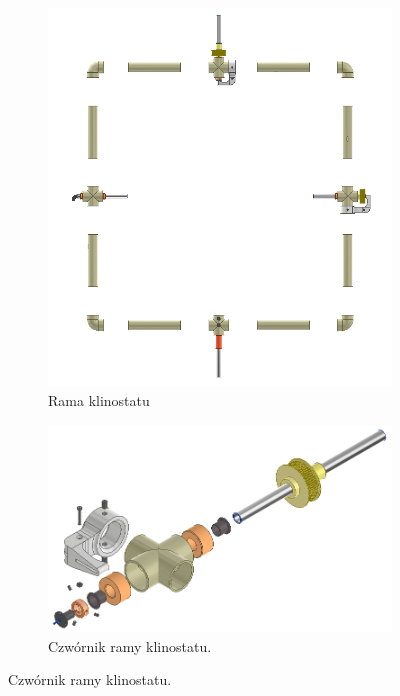 \begin{figure}[]
	\centering
	
	\begin{subfigure}[b]{.49\textwidth}
		\centering
		\includegraphics[width=\textwidth]{rama_40_aisass}
		\caption{Rama klinostatu} 
		\label{fig:rama_klinostatu}
	\end{subfigure}
	\hfill%
	\begin{subfigure}[b]{.49\textwidth}
		\centering
		\includegraphics[width=\textwidth]{2_diss}
		\caption{Czwórnik ramy klinostatu.} 
		

\end{subfigure}
\end{figure}
